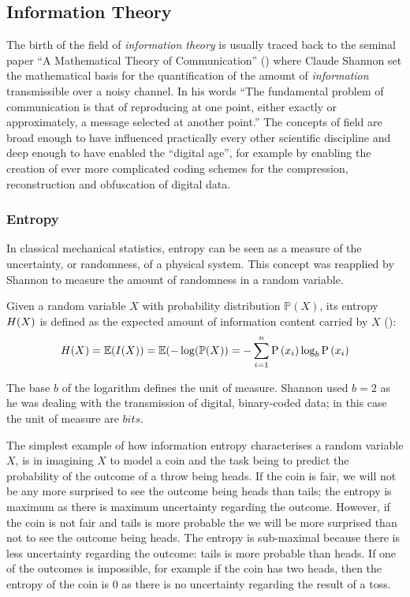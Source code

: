 \subsection{Information Theory} \label{subsec:information-theory}
The birth of the field of \textit{information theory} is usually traced back to the seminal paper \enquote{A Mathematical Theory of Communication} (\cite{Shannon1949}) where Claude Shannon set the mathematical basis for the quantification of the amount of \textit{information} transmissible over a noisy channel. 
In his words \enquote{The fundamental problem of communication is that of reproducing at one point, either exactly or approximately, a message selected at another point.}
The concepts of field are broad enough to have influenced practically every other scientific discipline and deep enough to have enabled the \enquote{digital age}, for example by enabling the creation of ever more complicated coding schemes for the compression, reconstruction and obfuscation of digital data.

\subsubsection{Entropy}
In classical mechanical statistics, entropy can be seen as a measure of the uncertainty, or randomness, of a physical system.  
This concept was reapplied by Shannon to measure the amount of randomness in a random variable.
\begin{definition}
	Given a random variable $X$ with probability distribution $\mathbb{P}(X)$, its entropy $H(X)$ is defined as the expected amount of information content carried by $X$ (\cite{Schneider2005}):
\begin{equation} \label{eq:entropy}
	H(X) = \mathbb{E}(I(X)) = \mathbb{E}(-\log (\mathbb{P}(X)) = -\sum_{i=1}^{n} \mathrm{P}\left(x_{i}\right) \log _{b} \mathrm{P}\left(x_{i}\right)
\end{equation}
\end{definition}
The base $b$ of the logarithm defines the unit of measure.  Shannon used $b=2$ as he was dealing with the transmission of digital, binary-coded data; in this case the unit of measure are $bits$.

The simplest example of how information entropy characterises a random variable $X$, is in imagining $X$ to model a coin and the task being to predict the probability of the outcome of a throw being heads.
If the coin is fair, we will not be any more surprised to see the outcome being heads than tails; the entropy is maximum as there is maximum uncertainty regarding the outcome.
However, if the coin is not fair and tails is more probable the we will be more surprised than not to see the outcome being heads.  
The entropy is sub-maximal because there is less uncertainty regarding the outcome: tails is more probable than heads.
If one of the outcomes is impossible, for example if the coin has two heads, then the entropy of the coin is $0$ as there is no uncertainty regarding the result of a toss.


